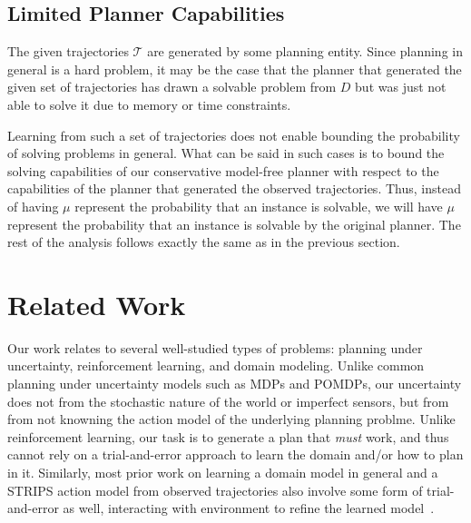 \documentclass{article}
\begin{document}
	\subsection{Limited Planner Capabilities}
	The given trajectories $\mathcal{T}$ are generated by some planning entity. Since planning in general is a hard problem, it may be the case that the planner that generated the given set of trajectories has drawn a solvable problem from $D$ but was just not able to solve it due to memory or time constraints. 
	
	Learning from such a set of trajectories does not enable bounding the probability of solving problems in general. What can be said in such cases is to bound the solving capabilities of our conservative model-free planner with respect to the capabilities of the planner that generated the observed trajectories. Thus, instead of having $\mu$ represent the probability that an instance is solvable, we will have $\mu$ represent the probability that an instance is solvable by the original planner. The rest of the analysis follows exactly the same as in the previous section.
	
	
	\section{Related Work}
	
	Our work relates to several well-studied types of problems: planning under uncertainty, reinforcement learning, and domain modeling. 
	Unlike common planning under uncertainty models such as MDPs and POMDPs, our uncertainty does not 
	from the stochastic nature of the world or imperfect sensors, but from from not knowning the action model of the underlying planning problme. Unlike reinforcement learning, our task is to generate a plan that {\em must} work, and thus cannot rely on a trial-and-error approach to learn the domain and/or how to plan in it. 
	Similarly, most prior work on learning a domain model in general and a STRIPS action model from observed trajectories also involve some form of trial-and-error as well, interacting with environment to refine the learned model~\cite{mourao2012learning,wang1994learning,wang1994learning,walsh2008efficientLearning,levine2006explanation,jimenez2013integrating}. 
	
\end{document}

